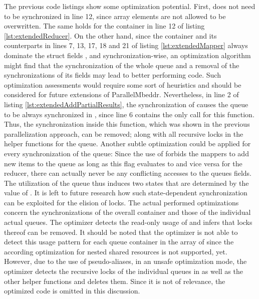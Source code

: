 The previous code listings show some optimization potential. First,  does not need to be synchronized in line 12, since array elements are not allowed to be overwritten. The same holds for the container  in line 12 of listing \ref{lst:extendedReducer}. On the other hand, since the container  and its counterparts in lines 7, 13, 17, 18 and 21 of listing \ref{lst:extendedMapper} always dominate the struct fields ,  and  synchronization-wise, an optimization algorithm might find that the synchronization of the whole queue and a removal of the synchronizations of its fields may lead to better performing code. Such optimization assessments would require some sort of heuristics and should be considered for future extensions of ParallelMbeddr. Nevertheless, in line 2 of listing \ref{lst:extendedAddPartialResults}, the synchronization of  causes the queue to be always synchronized in , since line 6 contains the only call for this function. Thus, the synchronization inside this function, which was shown in the previous parallelization approach, can be removed; along with all recursive locks in the helper functions for the queue. Another subtle optimization could be applied for every synchronization of the queue: Since the use of  forbids the mappers to add new items to the queue as long as this flag evaluates to  and vice versa for the reducer, there can actually never be any conflicting accesses to the queues fields. The utilization of the queue thus induces two states that are determined by the value of . It is left to future research how such state-dependent synchronization can be exploited for the elision of locks. The actual performed optimizations concern the synchronizations of the overall  container and those of the individual actual queues. The optimizer detects the read-only usage of  and infers that locks thereof can be removed. It should be noted that the optimizer is not able to detect this usage pattern for each queue container in the array of  since the according optimization for nested shared resources is not supported, yet. However, due to the use of pseudo-aliases, in an unsafe optimization mode, the optimizer detects the recursive locks of the individual queues in  as well as the other helper functions and deletes them. Since it is not of relevance, the optimized code is omitted in this discussion.

